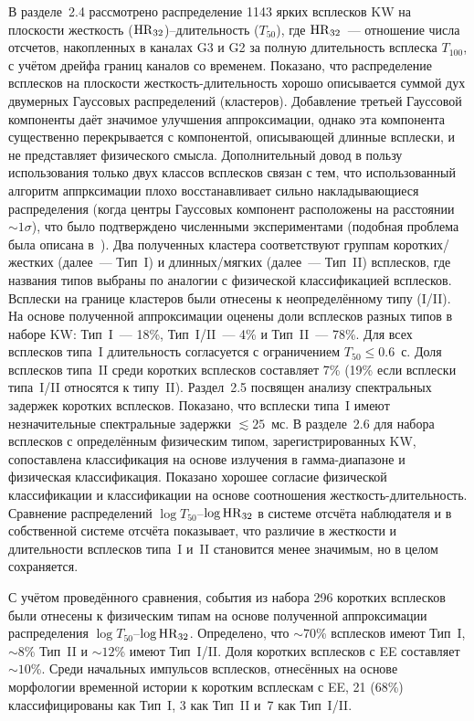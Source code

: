 В разделе~2.4 рассмотрено распределение 1143 ярких всплесков KW на плоскости 
жесткость (${\mathrm{HR}}_{32}$)--длительность ($T_{50}$),
где ${\mathrm{HR}}_{32}$~--- отношение числа отсчетов, накопленных в каналах G3 и G2 
за полную длительность всплеска $T_{100}$, с учётом дрейфа границ каналов со временем.
Показано, что распределение всплесков на плоскости жесткость-длительность 
хорошо описывается суммой дух двумерных Гауссовых распределений (кластеров).
Добавление третьей Гауссовой компоненты даёт значимое улучшения аппроксимации, однако эта 
компонента существенно перекрывается с компонентой, описывающей длинные всплески, 
и не представляет физического смысла. Дополнительный довод в пользу использования
только двух классов всплесков связан с тем, что использованный алгоритм аппрксимации
плохо восстанавливает сильно накладывающиеся распределения 
(когда центры Гауссовых компонент расположены на расстоянии $\sim 1\sigma$),
что было подтверждено численными экспериментами (подобная проблема была
описана в~\citep{Igoshev_2013MNRAS}).
Два полученных кластера соответствуют 
группам коротких/жестких (далее~--- Тип~I) и длинных/мягких (далее~--- Тип~II) всплесков,
где названия типов выбраны по аналогии с физической классификацией всплесков.
Всплески на границе кластеров были отнесены к неопределённому типу (I/II).
На основе полученной аппроксимации оценены доли всплесков разных 
типов в наборе KW: Тип~I~--- 18\%, Тип~I/II~--- 4\% и Тип~II~--- 78\%. 
Для всех всплесков типа~I длительность согласуется 
с ограничением $T_{50} \leq 0.6$~с. Доля всплесков типа~II среди коротких всплесков 
составляет 7\% (19\% если всплески типа~I/II относятся к типу~II).
Раздел~2.5 посвящен анализу спектральных задержек коротких всплесков. 
Показано, что всплески типа~I имеют незначительные спектральные задержки $\lesssim 25$~мс.
В разделе~2.6 для набора всплесков с определённым физическим типом, 
зарегистрированных KW, сопоставлена классификация на основе излучения 
в гамма-диапазоне и физическая классификация. Показано хорошее согласие физической классификации 
и классификации на основе соотношения жесткость-длительность.
Сравнение распределений $\log T_{50}$--$\log {\mathrm{HR}}_{32}$ в системе отсчёта наблюдателя 
и в собственной системе отсчёта показывает, что различие в жесткости и длительности
всплесков типа~I и~II становится менее значимым, но в целом сохраняется.

С учётом проведённого сравнения, события из набора 296 коротких всплесков 
были отнесены к физическим типам на основе полученной аппроксимации 
распределения $\log T_{50}$--$\log {\mathrm{HR}}_{32}$. 
Определено, что $\sim 70$\% всплесков имеют Тип~I, 
$\sim 8$\% Тип~II и $\sim 12$\% имеют Тип~I/II. 
Доля коротких всплесков с EE составляет $\sim 10$\%.
Среди начальных импульсов всплесков, отнесённых на основе морфологии временной 
истории к коротким всплескам с EE, 21 (68\%) классифицированы как Тип~I, 3 как Тип~II 
и~7 как Тип~I/II.

